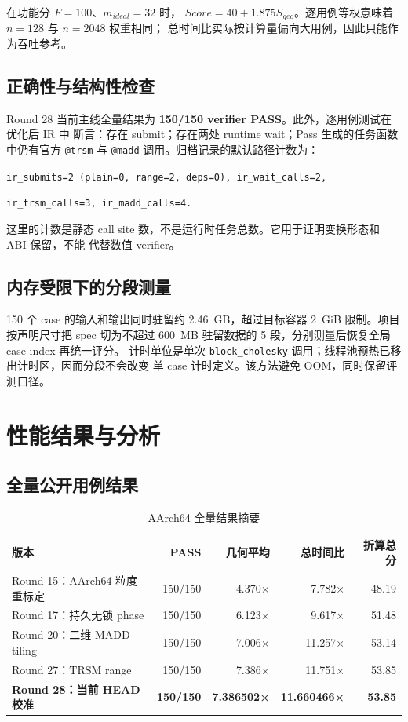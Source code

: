 \documentclass[UTF8,a4paper,openany,11pt,fontset=fandol]{ctexrep}
\begin{document}
在功能分 \(F=100\)、\(m_{ideal}=32\) 时，
\(Score=40+1.875S_{geo}\)。逐用例等权意味着 \(n=128\) 与 \(n=2048\) 权重相同；
总时间比实际按计算量偏向大用例，因此只能作为吞吐参考。

\section{正确性与结构性检查}

Round 28 当前主线全量结果为 \textbf{150/150 verifier PASS}。此外，逐用例测试在优化后 IR 中
断言：存在 submit；存在两处 runtime wait；Pass 生成的任务函数中仍有官方
\texttt{@trsm} 与 \texttt{@madd} 调用。归档记录的默认路径计数为：

\begin{center}
\texttt{ir\_submits=2 (plain=0, range=2, deps=0), ir\_wait\_calls=2,}\par
\texttt{ir\_trsm\_calls=3, ir\_madd\_calls=4.}
\end{center}

这里的计数是静态 call site 数，不是运行时任务总数。它用于证明变换形态和 ABI 保留，不能
代替数值 verifier。

\section{内存受限下的分段测量}

150 个 case 的输入和输出同时驻留约 2.46~GB，超过目标容器 2~GiB 限制。项目按声明尺寸把
spec 切为不超过 600~MB 驻留数据的 5 段，分别测量后恢复全局 case index 再统一评分。
计时单位是单次 \texttt{block\_cholesky} 调用；线程池预热已移出计时区，因而分段不会改变
单 case 计时定义。该方法避免 OOM，同时保留评测口径。

\chapter{性能结果与分析}

\section{全量公开用例结果}

\begin{table}[H]
  \centering
  \caption{AArch64 全量结果摘要}
  \small
  \begin{tabular}{lrrrr}
    \toprule
    版本 & PASS & 几何平均 & 总时间比 & 折算总分 \\
    \midrule
    Round 15：AArch64 粒度重标定 & 150/150 & 4.370× & 7.782× & 48.19 \\
    Round 17：持久无锁 phase & 150/150 & 6.123× & 9.617× & 51.48 \\
    Round 20：二维 MADD tiling & 150/150 & 7.006× & 11.257× & 53.14 \\
    Round 27：TRSM range & 150/150 & 7.386× & 11.751× & 53.85 \\
    \textbf{Round 28：当前 HEAD 校准} & \textbf{150/150} & \textbf{7.386502×} & \textbf{11.660466×} & \textbf{53.85} \\
    \bottomrule
  \end{tabular}
\end{table}
\end{document}
